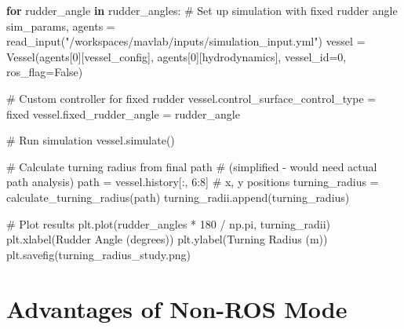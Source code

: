 \documentclass[
  letterpaper,
  DIV=11,
  numbers=noendperiod]{scrreprt}
\newenvironment{Shaded}{\begin{snugshade}}{\end{snugshade}}
\newcommand{\CommentTok}[1]{\textcolor[rgb]{0.37,0.37,0.37}{#1}}
\newcommand{\ControlFlowTok}[1]{\textcolor[rgb]{0.00,0.23,0.31}{\textbf{#1}}}
\newcommand{\DecValTok}[1]{\textcolor[rgb]{0.68,0.00,0.00}{#1}}
\newcommand{\KeywordTok}[1]{\textcolor[rgb]{0.00,0.23,0.31}{\textbf{#1}}}
\newcommand{\NormalTok}[1]{\textcolor[rgb]{0.00,0.23,0.31}{#1}}
\newcommand{\OperatorTok}[1]{\textcolor[rgb]{0.37,0.37,0.37}{#1}}
\newcommand{\StringTok}[1]{\textcolor[rgb]{0.13,0.47,0.30}{#1}}
\newcommand{\VariableTok}[1]{\textcolor[rgb]{0.07,0.07,0.07}{#1}}
\begin{document}
\begin{enumerate}
\begin{Shaded}
\begin{Highlighting}[]
    \ControlFlowTok{for}\NormalTok{ rudder\_angle }\KeywordTok{in}\NormalTok{ rudder\_angles:}
        \CommentTok{\# Set up simulation with fixed rudder angle}
\NormalTok{        sim\_params, agents }\OperatorTok{=}\NormalTok{ read\_input(}\StringTok{"/workspaces/mavlab/inputs/simulation\_input.yml"}\NormalTok{)}
\NormalTok{        vessel }\OperatorTok{=}\NormalTok{ Vessel(agents[}\DecValTok{0}\NormalTok{][}\StringTok{\textquotesingle{}vessel\_config\textquotesingle{}}\NormalTok{], agents[}\DecValTok{0}\NormalTok{][}\StringTok{\textquotesingle{}hydrodynamics\textquotesingle{}}\NormalTok{], vessel\_id}\OperatorTok{=}\DecValTok{0}\NormalTok{, ros\_flag}\OperatorTok{=}\VariableTok{False}\NormalTok{)}

        \CommentTok{\# Custom controller for fixed rudder}
\NormalTok{        vessel.control\_surface\_control\_type }\OperatorTok{=} \StringTok{\textquotesingle{}fixed\textquotesingle{}}
\NormalTok{        vessel.fixed\_rudder\_angle }\OperatorTok{=}\NormalTok{ rudder\_angle}

        \CommentTok{\# Run simulation}
\NormalTok{        vessel.simulate()}

        \CommentTok{\# Calculate turning radius from final path}
        \CommentTok{\# (simplified {-} would need actual path analysis)}
\NormalTok{        path }\OperatorTok{=}\NormalTok{ vessel.history[:, }\DecValTok{6}\NormalTok{:}\DecValTok{8}\NormalTok{]  }\CommentTok{\# x, y positions}
\NormalTok{        turning\_radius }\OperatorTok{=}\NormalTok{ calculate\_turning\_radius(path)}
\NormalTok{        turning\_radii.append(turning\_radius)}

    \CommentTok{\# Plot results}
\NormalTok{    plt.plot(rudder\_angles }\OperatorTok{*} \DecValTok{180} \OperatorTok{/}\NormalTok{ np.pi, turning\_radii)}
\NormalTok{    plt.xlabel(}\StringTok{\textquotesingle{}Rudder Angle (degrees)\textquotesingle{}}\NormalTok{)}
\NormalTok{    plt.ylabel(}\StringTok{\textquotesingle{}Turning Radius (m)\textquotesingle{}}\NormalTok{)}
\NormalTok{    plt.savefig(}\StringTok{\textquotesingle{}turning\_radius\_study.png\textquotesingle{}}\NormalTok{)}
\end{Highlighting}
\end{Shaded}
\end{enumerate}

\section*{Advantages of Non-ROS Mode}\label{advantages-of-non-ros-mode}
\end{document}

